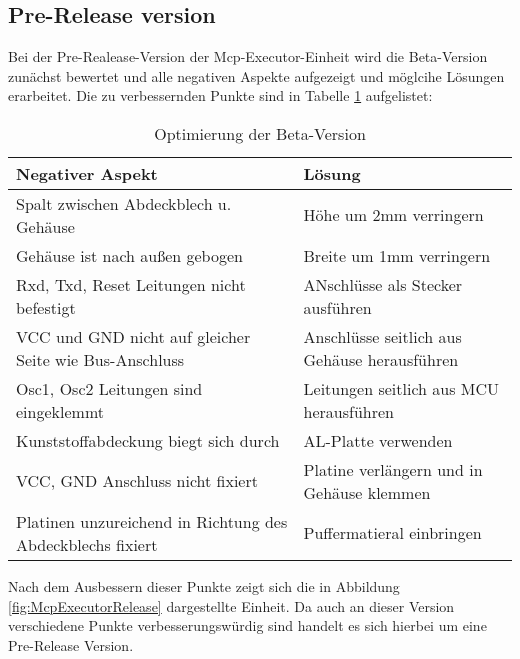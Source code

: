 \subsection{Pre-Release version}
\label{kap:McpExecutorPreReleaseversion}
Bei der Pre-Realease-Version der Mcp-Executor-Einheit wird die Beta-Version zunächst bewertet und alle negativen Aspekte aufgezeigt und möglcihe Lösungen erarbeitet. Die zu verbessernden Punkte sind in Tabelle \ref{tab:McpExecutorEinheitNegAspekte} aufgelistet:

\begin{table}[H]
	\caption{Optimierung der Beta-Version}\label{tab:McpExecutorEinheitNegAspekte}
	\centering
	\begin{tabular}{|p{5cm}|p{5cm}|}
		\hline
		\textbf{Negativer Aspekt} & \textbf{Lösung} \\
		\hline
		Spalt zwischen Abdeckblech u. Gehäuse & Höhe um 2mm verringern \\
		\hline
		Gehäuse ist nach außen gebogen & Breite um 1mm verringern \\
		\hline
		Rxd, Txd, Reset Leitungen nicht befestigt & ANschlüsse als Stecker ausführen \\
		\hline
		VCC und GND nicht auf gleicher Seite wie Bus-Anschluss & Anschlüsse seitlich aus Gehäuse herausführen \\
		\hline
		Osc1, Osc2 Leitungen sind eingeklemmt & Leitungen seitlich aus MCU herausführen \\
		\hline
		Kunststoffabdeckung biegt sich durch & AL-Platte verwenden \\
		\hline
		VCC, GND Anschluss nicht fixiert & Platine verlängern und in Gehäuse klemmen \\
		\hline
		Platinen unzureichend in Richtung des Abdeckblechs fixiert & Puffermatieral einbringen \\
		\hline
	\end{tabular} 
\end{table}

Nach dem Ausbessern dieser Punkte zeigt sich die in Abbildung \ref{fig:McpExecutorRelease} dargestellte Einheit. Da auch an dieser Version verschiedene Punkte verbesserungswürdig sind handelt es sich hierbei um eine Pre-Release Version.

